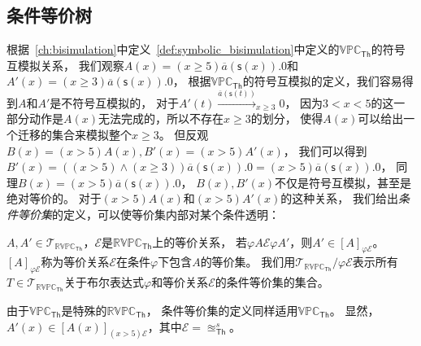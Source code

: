    \subsection{条件等价树}

   根据~\ref{ch:bisimulation}中定义~\ref{def:symbolic_bisimulation}中定义的$\mathbb{VPC}_{\mathsf{Th}}$的符号互模拟关系，
   我们观察$A(x)=(x\geq 5)\overline{a}(\mathsf{s}(x)).0$和$A'(x)=(x\geq 3)\overline{a}(\mathsf{s}(x)).0$，
   根据$\mathbb{VPC}_\mathsf{Th}$的符号互模拟的定义，我们容易得到$A$和$A'$是不符号互模拟的，
   对于$A'(t)\stackrel{\overline{a}(\mathsf{s}(t))}{\longrightarrow}_{x\geq 3} 0$，
   因为$3<x<5$的这一部分动作是$A(x)$无法完成的，所以不存在$x\geq 3$的划分，
   使得$A(x)$可以给出一个迁移的集合来模拟整个$x\geq 3$。
   但反观$B(x)=(x>5)A(x),B'(x)=(x>5)A'(x)$，
   我们可以得到$B'(x)=((x>5)\wedge(x\geq 3))\overline{a}(\mathsf{s}(x)).0=(x>5)\overline{a}(\mathsf{s}(x)).0$，
   同理$B(x)=(x>5)\overline{a}(\mathsf{s}(x)).0$，
   $B(x),B'(x)$不仅是符号互模拟，甚至是绝对等价的。
   对于$(x>5)A(x)$和$(x>5)A'(x)$的这种关系，
   我们给出\textit{条件等价集}的定义，可以使等价集内部对某个条件透明：

   \begin{definition}[条件等价集]
     $A,A'\in \mathcal{T}_{\mathbb{RVPC}_{\mathsf{Th}}}$，$\mathcal{E}$是$\mathbb{RVPC}_{\mathsf{Th}}$上的等价关系，
     若$\varphi A \mathcal{E} \varphi A'$，则$A'\in [A]_{\varphi \mathcal{E}}$。
     $[A]_{\varphi \mathcal{E}}$称为等价关系$\mathcal{E}$在条件$\varphi$下包含$A$的等价集。 
     我们用$\mathcal{T}_{\mathbb{RVPC}_{\mathsf{Th}}}/\varphi \mathcal{E}$表示所有$T\in\mathcal{T}_{\mathbb{RVPC}_{\mathsf{Th}}}$关于布尔表达式$\varphi$和等价关系$\mathcal{E}$的条件等价集的集合。 
   \end{definition} 

   由于$\mathbb{VPC}_{\mathsf{Th}}$是特殊的$\mathbb{RVPC}_{\mathsf{Th}}$，
   条件等价集的定义同样适用$\mathbb{VPC}_{\mathsf{Th}}$。
   显然，$A'(x)\in [A(x)]_{(x>5)\mathcal{E}}$，其中$\mathcal{E}=\approxeq_{\mathsf{Th}}^s$。
   
